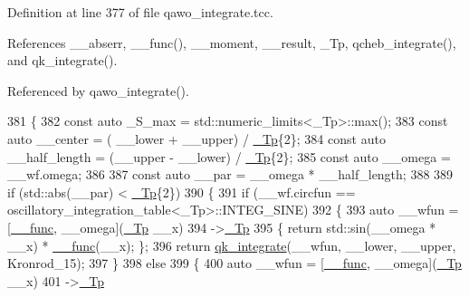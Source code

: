 Definition at line 377 of file qawo\+\_\+integrate.\+tcc.



References \+\_\+\+\_\+abserr, \+\_\+\+\_\+func(), \+\_\+\+\_\+moment, \+\_\+\+\_\+result, \+\_\+\+Tp, qcheb\+\_\+integrate(), and qk\+\_\+integrate().



Referenced by qawo\+\_\+integrate().


\begin{DoxyCode}
381     \{
382       \textcolor{keyword}{const} \textcolor{keyword}{auto} \_S\_max = std::numeric\_limits<\_Tp>::max();
383       \textcolor{keyword}{const} \textcolor{keyword}{auto} \_\_center = ( \_\_lower + \_\_upper) / \hyperlink{namespace____gnu__cxx_a3b19a9c800ca194374ef9172290f7d79}{\_Tp}\{2\};
384       \textcolor{keyword}{const} \textcolor{keyword}{auto} \_\_half\_length = (\_\_upper - \_\_lower) / \hyperlink{namespace____gnu__cxx_a3b19a9c800ca194374ef9172290f7d79}{\_Tp}\{2\};
385       \textcolor{keyword}{const} \textcolor{keyword}{auto} \_\_omega = \_\_wf.omega;
386 
387       \textcolor{keyword}{const} \textcolor{keyword}{auto} \_\_par = \_\_omega * \_\_half\_length;
388 
389       \textcolor{keywordflow}{if} (std::abs(\_\_par) < \hyperlink{namespace____gnu__cxx_a3b19a9c800ca194374ef9172290f7d79}{\_Tp}\{2\})
390         \{
391           \textcolor{keywordflow}{if} (\_\_wf.circfun == oscillatory\_integration\_table<\_Tp>::INTEG\_SINE)
392             \{
393               \textcolor{keyword}{auto} \_\_wfun = [\hyperlink{namespace____gnu__cxx_af2b2f0c7a2ae72b922b1afefae5a65b2}{\_\_func}, \_\_omega](\hyperlink{namespace____gnu__cxx_a3b19a9c800ca194374ef9172290f7d79}{\_Tp} \_\_x)
394                             ->\hyperlink{namespace____gnu__cxx_a3b19a9c800ca194374ef9172290f7d79}{\_Tp}
395                             \{ \textcolor{keywordflow}{return} std::sin(\_\_omega * \_\_x) * \hyperlink{namespace____gnu__cxx_af2b2f0c7a2ae72b922b1afefae5a65b2}{\_\_func}(\_\_x); \};
396               \textcolor{keywordflow}{return} \hyperlink{namespace____gnu__cxx_a02cfb416b1f1cc3a5dd2b12af3877bd4}{qk\_integrate}(\_\_wfun, \_\_lower, \_\_upper, Kronrod\_15);
397             \}
398           \textcolor{keywordflow}{else}
399             \{
400               \textcolor{keyword}{auto} \_\_wfun = [\hyperlink{namespace____gnu__cxx_af2b2f0c7a2ae72b922b1afefae5a65b2}{\_\_func}, \_\_omega](\hyperlink{namespace____gnu__cxx_a3b19a9c800ca194374ef9172290f7d79}{\_Tp} \_\_x)
401                             ->\hyperlink{namespace____gnu__cxx_a3b19a9c800ca194374ef9172290f7d79}{\_Tp}

\end{DoxyCode}
